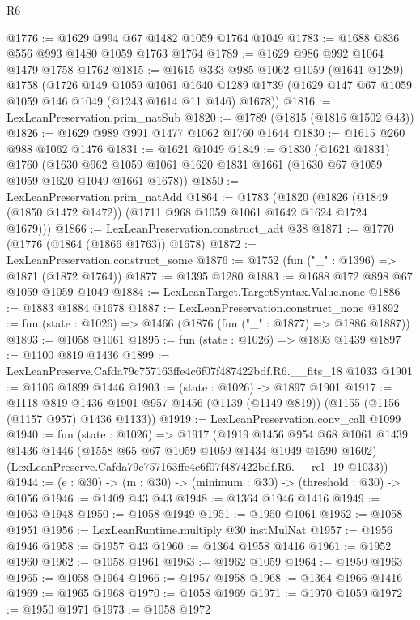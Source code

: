 \begin{lexlean}{R6}
\begin{coremodule}
@1776 := @1629 @994 @67 @1482 @1059 @1764 @1049
@1783 := @1688 @836 @556 @993 @1480 @1059 @1763 @1764
@1789 := @1629 @986 @992 @1064 @1479 @1758 @1762
@1815 := @1615
    @333
    @985
    @1062
    @1059
    (@1641 @1289)
    @1758
    (@1726
      @149
      @1059
      @1061
      @1640
      @1289
      @1739
      (@1629 @147 @67 @1059 @1059 @146 @1049 (@1243 @1614 @11 @146) @1678))
@1816 := LexLeanPreservation.prim_natSub
@1820 := @1789 (@1815 (@1816 @1502 @43))
@1826 := @1629 @989 @991 @1477 @1062 @1760 @1644
@1830 := @1615 @260 @988 @1062 @1476
@1831 := @1621 @1049
@1849 := @1830
    (@1621 @1831)
    @1760
    (@1630 @962 @1059 @1061 @1620 @1831 @1661 (@1630 @67 @1059 @1059 @1620 @1049 @1661 @1678))
@1850 := LexLeanPreservation.prim_natAdd
@1864 := @1783
    (@1820 (@1826 (@1849 (@1850 @1472 @1472)) (@1711 @968 @1059 @1061 @1642 @1624 @1724 @1679)))
@1866 := LexLeanPreservation.construct_adt @38
@1871 := @1770 (@1776 (@1864 (@1866 @1763)) @1678)
@1872 := LexLeanPreservation.construct_some
@1876 := @1752 (fun ("_" : @1396) => @1871 (@1872 @1764))
@1877 := @1395 @1280
@1883 := @1688 @172 @898 @67 @1059 @1059 @1049
@1884 := LexLeanTarget.TargetSyntax.Value.none
@1886 := @1883 @1884 @1678
@1887 := LexLeanPreservation.construct_none
@1892 := fun (state : @1026) => @1466 (@1876 (fun ("_" : @1877) => @1886 @1887))
@1893 := @1058 @1061
@1895 := fun (state : @1026) => @1893 @1439
@1897 := @1100 @819 @1436
@1899 := LexLeanPreserve.Cafda79c757163ffe4c6f07f487422bdf.R6.__fits_18 @1033
@1901 := @1106 @1899 @1446
@1903 := (state : @1026) -> @1897 @1901
@1917 := @1118
    @819
    @1436
    @1901
    @957
    @1456
    (@1139 (@1149 @819))
    (@1155 (@1156 (@1157 @957) @1436 @1133))
@1919 := LexLeanPreservation.conv_call @1099
@1940 := fun (state : @1026) =>
  @1917
    (@1919
      @1456
      @954
      @68
      @1061
      @1439
      @1436
      @1446
      (@1558 @65 @67 @1059 @1059 @1434 @1049 @1590 @1602)
      (LexLeanPreserve.Cafda79c757163ffe4c6f07f487422bdf.R6.__rel_19 @1033))
@1944 := (e : @30) -> (m : @30) -> (minimum : @30) -> (threshold : @30) -> @1056
@1946 := @1409 @43 @43
@1948 := @1364 @1946 @1416
@1949 := @1063 @1948
@1950 := @1058 @1949
@1951 := @1950 @1061
@1952 := @1058 @1951
@1956 := LexLeanRuntime.multiply @30 instMulNat
@1957 := @1956 @1946
@1958 := @1957 @43
@1960 := @1364 @1958 @1416
@1961 := @1952 @1960
@1962 := @1058 @1961
@1963 := @1962 @1059
@1964 := @1950 @1963
@1965 := @1058 @1964
@1966 := @1957 @1958
@1968 := @1364 @1966 @1416
@1969 := @1965 @1968
@1970 := @1058 @1969
@1971 := @1970 @1059
@1972 := @1950 @1971
@1973 := @1058 @1972

\end{coremodule}
\end{lexlean}
